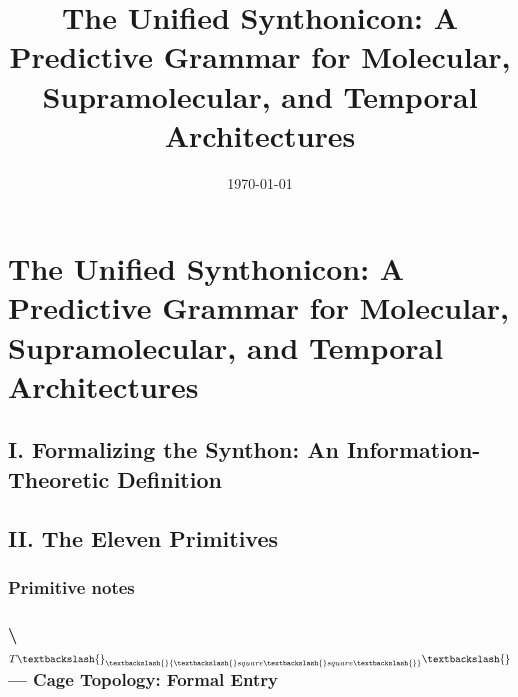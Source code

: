 \documentclass{article[11pt,letterpaper]}
\title{The Unified Synthonicon: A Predictive Grammar for Molecular, Supramolecular, and Temporal Architectures}
\author{}
\date{\today}
\begin{document}
\maketitle

\tableofcontents

\clearpage

\section{The Unified Synthonicon: A Predictive Grammar for Molecular, Supramolecular, and Temporal Architectures}
\label{sec:the-unified-synthonicon-a-predictive-grammar-for-m}


\subsection{I. Formalizing the Synthon: An Information-Theoretic Definition}
\label{sec:i-formalizing-the-synthon-an-information-theoretic}


\subsection{II. The Eleven Primitives}
\label{sec:ii-the-eleven-primitives}


\subsubsection{Primitive notes}
\label{sec:primitive-notes}


\subsubsection{\textbackslash{}$T\textbackslash{}_\textbackslash{}{\textbackslash{}square\textbackslash{}square\textbackslash{}}\textbackslash{}$ — Cage Topology: Formal Entry}
\label{sec:tsquaresquare--cage-topology-formal-entry}

\end{document}
